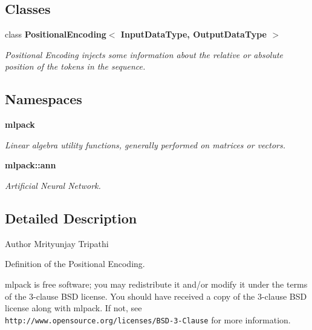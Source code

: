 \subsection*{Classes}
\begin{DoxyCompactItemize}
\item 
class \textbf{ Positional\+Encoding$<$ Input\+Data\+Type, Output\+Data\+Type $>$}
\begin{DoxyCompactList}\small\item\em Positional Encoding injects some information about the relative or absolute position of the tokens in the sequence. \end{DoxyCompactList}\end{DoxyCompactItemize}
\subsection*{Namespaces}
\begin{DoxyCompactItemize}
\item 
 \textbf{ mlpack}
\begin{DoxyCompactList}\small\item\em Linear algebra utility functions, generally performed on matrices or vectors. \end{DoxyCompactList}\item 
 \textbf{ mlpack\+::ann}
\begin{DoxyCompactList}\small\item\em Artificial Neural Network. \end{DoxyCompactList}\end{DoxyCompactItemize}


\subsection{Detailed Description}
\begin{DoxyAuthor}{Author}
Mrityunjay Tripathi
\end{DoxyAuthor}
Definition of the Positional Encoding.

mlpack is free software; you may redistribute it and/or modify it under the terms of the 3-\/clause B\+SD license. You should have received a copy of the 3-\/clause B\+SD license along with mlpack. If not, see {\tt http\+://www.\+opensource.\+org/licenses/\+B\+S\+D-\/3-\/\+Clause} for more information. 
